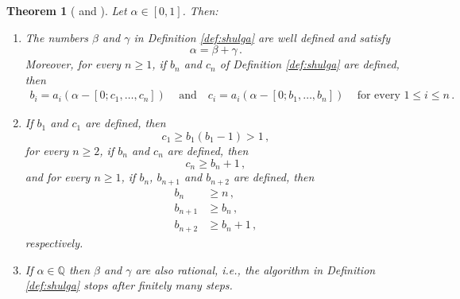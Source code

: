 \documentclass[a4paper,12pt]{article}
\newtheorem{thm}{Theorem}
\begin{document}
\begin{thm}[\cite{shulga} and \cite{GN}]
\label{real_alg_prop}
Let $\alpha\in[0,1]$. Then:
\begin{enumerate}
\item
The numbers $\beta$ and $\gamma$ in Definition \ref{def:shulga} are well defined and satisfy 
\begin{equation*}
    \alpha=\beta+\gamma\,.  
\end{equation*} 
Moreover, for every $n\geq1$, if $b_n$ and $c_n$ of Definition \ref{def:shulga} are defined, then 
\begin{equation*}%
\begin{aligned}
    b_i = a_i(\alpha-[0;c_1,\ldots,c_n])\,\quad\textrm{and}\quad 
    c_i = a_i(\alpha-[0;b_1,\ldots,b_n])\,\quad\textrm{for every $1\leq i\leq n$}\,.
\end{aligned}
\end{equation*}

\item
If $b_1$ and $c_1$ are defined, then 
$$
c_1\ge b_1(b_1-1)>1\,,
$$
for every $n\ge 2$, if $b_n$ and $c_n$ are defined, then
\begin{equation*}%
    c_n\ge b_n+1\,,
\end{equation*}
and for every $n\ge 1$, if $b_n$, $b_{n+1}$ and $b_{n+2}$ are defined, then 
\begin{align*}
b_n&\ge n\,,\\
b_{n+1}&\ge b_n\,,\\%
b_{n+2}&\ge b_n+1\,,
\end{align*}
respectively.
\item
If $\alpha\in\mathbb{Q}$ then $\beta$ and $\gamma$ are also rational, i.e., the algorithm in Definition \ref{def:shulga} stops after finitely many steps.
\end{enumerate}
\end{thm}
    
\end{document}
